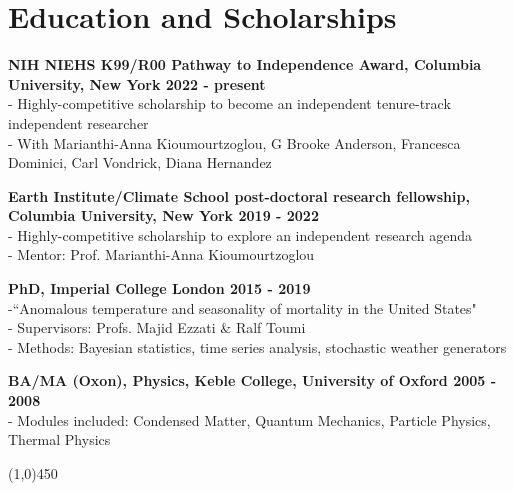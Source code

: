 \section*{Education and Scholarships}

\textbf{NIH NIEHS K99/R00 Pathway to Independence Award, Columbia University, New York \hfill 2022 - present}\\
- Highly-competitive scholarship to become an independent tenure-track independent researcher\\
- With Marianthi-Anna Kioumourtzoglou, G Brooke Anderson, Francesca Dominici, Carl Vondrick, Diana Hernandez \bigskip

\noindent \textbf{Earth Institute/Climate School post-doctoral research fellowship, Columbia University, New York \hfill 2019 - 2022}\\
- Highly-competitive scholarship to explore an independent research agenda\\
- Mentor: Prof. Marianthi-Anna Kioumourtzoglou \bigskip

\noindent \textbf{PhD, Imperial College London \hfill 2015 - 2019}\\
-``Anomalous temperature and seasonality of mortality in the United States"\\	 		
- Supervisors: Profs. Majid Ezzati \& Ralf Toumi\\
- Methods: Bayesian statistics, time series analysis, stochastic weather generators \bigskip

\noindent \textbf{BA/MA (Oxon), Physics, Keble College, University of Oxford \hfill 2005 - 2008}\\
- Modules included: Condensed Matter,  Quantum Mechanics, Particle Physics, Thermal Physics		                             
\begin{center} \line(1,0){450} \end{center}